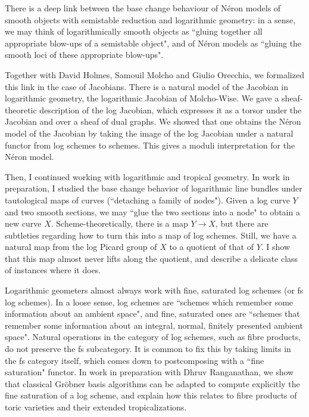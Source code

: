 \documentclass[12pt]{extarticle}
\begin{document}
There is a deep link between the base change behaviour of N\'eron models of smooth objects with semistable reduction and logarithmic geometry: in a sense, we may think of logarithmically smooth objects as ``gluing together all appropriate blow-ups of a semistable object", and of N\'eron models as ``gluing the smooth loci of these appropriate blow-ups".

Together with David Holmes, Samouil Molcho and Giulio Orecchia, we formalized this link in the case of Jacobians. There is a natural model of the Jacobian in logarithmic geometry, the logarithmic Jacobian of Molcho-Wise. We gave a sheaf-theoretic description of the log Jacobian, which expresses it as a torsor under the Jacobian and over a sheaf of dual graphs. We showed that one obtains the N\'eron model of the Jacobian by taking the image of the log Jacobian under a natural functor from log schemes to schemes. This gives a moduli interpretation for the N\'eron model.

Then, I continued working with logarithmic and tropical geometry. In work in preparation, I studied the base change behavior of logarithmic line bundles under tautological maps of curves (``detaching a family of nodes"). Given a log curve $Y$ and two smooth sections, we may ``glue the two sections into a node" to obtain a new curve $X$. Scheme-theoretically, there is a map $Y \to X$, but there are subtleties regarding how to turn this into a map of log schemes. Still, we have a natural map from the log Picard group of $X$ to a quotient of that of $Y$. I show that this map almost never lifts along the quotient, and describe a delicate class of instances where it does.

Logarithmic geometers almost always work with fine, saturated log schemes (or fs log schemes). In a loose sense, log schemes are ``schemes which remember some information about an ambient space", and fine, saturated ones are ``schemes that remember some information about an integral, normal, finitely presented ambient space". Natural operations in the category of log schemes, such as fibre products, do not preserve the fs subcategory. It is common to fix this by taking limits in the fs category itself, which comes down to postcomposing with a ``fine saturation" functor. In work in preparation with Dhruv Ranganathan, we show that classical Gr\"obner basis algorithms can be adapted to compute explicitly the fine saturation of a log scheme, and explain how this relates to fibre products of toric varieties and their extended tropicalizations.
\end{document}
